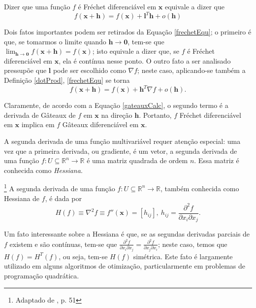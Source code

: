 Dizer que uma fun\c{c}\~{a}o $f$ \'{e} Fr\'{e}chet diferenci\'{a}vel em $\mathbf{x}$ equivale a dizer que
\begin{equation}
\label{frechetEqu}
f(\mathbf{x} + \mathbf{h}) = f(\mathbf{x}) + \mathbf{l}^T\mathbf{h} + o(\mathbf{h})
\end{equation}

Dois fatos importantes podem ser retirados da Equa\c{c}\~{a}o \eqref{frechetEqu}; o primeiro \'{e} que, se tomarmos o limite quando $\mathbf{h} \to \mathbf{0}$, tem-se que $\lim_{\mathbf{h} \to \mathbf{0}} f(\mathbf{x} + \mathbf{h}) = f(\mathbf{x})$; isto equivale a dizer que, se $f$ \'{e} Fr\'{e}chet diferenci\'{a}vel em $\mathbf{x}$, ela \'{e} cont\'{i}nua nesse ponto. O outro fato a ser analisado pressup\~{o}e que $\mathbf{l}$ pode ser escolhido como $\nabla f$; neste caso, aplicando-se tamb\'{e}m a Defini\c{c}\~{a}o \ref{dotProd}, \eqref{frechetEqu} se torna
\begin{equation}
\label{frechetEqu2}
f(\mathbf{x} + \mathbf{h}) = f(\mathbf{x}) + \mathbf{h}^T \nabla f + o(\mathbf{h}).
\end{equation}

Claramente, de acordo com a Equa\c{c}\~{a}o \ref{gateauxCalc}, o segundo termo \'{e} a derivada de G\^{a}teaux de $f$ em $\mathbf{x}$ na dire\c{c}\~{a}o $\mathbf{h}$. Portanto, $f$ Fr\'{e}chet diferenci\'{a}vel em $\mathbf{x}$ implica em $f$ G\^{a}teaux diferenci\'{a}vel em $\mathbf{x}$.

A segunda derivada de uma fun\c{c}\~{a}o multivari\'{a}vel requer aten\c{c}\~{a}o especial: uma vez que a primeira derivada, ou gradiente, \'{e} um vetor, a segunda derivada de uma fun\c{c}\~{a}o $f: U \subseteq \mathbb{R}^{n} \to \mathbb{R}$ \'{e} uma matriz quadrada de ordem $n$. Essa matriz \'{e} conhecida como \textit{Hessiana}.

\begin{definition}\footnote{Adaptado de \cite{yang}, p. 51}
A segunda derivada de uma fun\c{c}\~{a}o $f: U \subseteq \mathbb{R}^{n} \to \mathbb{R}$, tamb\'{e}m conhecida como Hessiana de $f$, \'{e} dada por
\begin{equation}
H(f) \equiv \nabla^2 f \equiv f''(\mathbf{x}) = [h_{ij}],~h_{ij} = \frac{\partial^2 f}{\partial x_i \partial x_j}.
\end{equation}
\end{definition}

Um fato interessante sobre a Hessiana \'{e} que, se as segundas derivadas parciais de $f$ existem e s\~{a}o cont\'{i}nuas, tem-se que $\frac{\partial^2 f}{\partial x_i \partial x_j} = \frac{\partial^2 f}{\partial x_j \partial x_i}$; neste caso, temos que $H(f) = H^{T}(f)$, ou seja, tem-se $H(f)$ sim\'{e}trica. Este fato \'{e} largamente utilizado em alguns algoritmos de otimiza\c{c}\~{a}o, particularmente em problemas de programa\c{c}\~{a}o quadr\'{a}tica.

